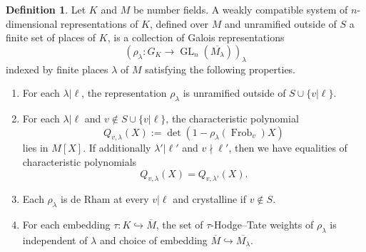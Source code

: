 \documentclass{amsart}
\theoremstyle{definition}
\newtheorem{definition}[theorem]{Definition}
\numberwithin{equation}{section} %
\newcommand{\GL}{\operatorname{GL}}
\newcommand{\Frob}{\operatorname{Frob}}
\newcommand{\ol}[1]{\overline{#1}}
\begin{document}
\begin{definition}
Let $K$ and $M$ be number fields.
A weakly compatible system of $n$-dimensional representations of $K$, defined over $M$ and unramified outside of $S$ a finite set of places of $K$, is a collection of Galois representations
\[
(\rho_\lambda: G_K \to \GL_n(\ol{M_\lambda}))_\lambda
\]
indexed by finite places $\lambda$ of $M$ satisfying the following properties.
\begin{enumerate}
    \item For each $\lambda|\ell$, the representation $\rho_\lambda$ is unramified outside of $S \cup \{v | \ell\}$. 
    \item For each $\lambda|\ell$ and $v \not\in S \cup \{v | \ell\}$, the characteristic polynomial
    \[
    Q_{v,\lambda}(X) := \det(1-\rho_\lambda(\Frob_v)X)
    \]
    lies in $M[X]$.
    If additionally $\lambda'|\ell'$ and $v \nmid \ell'$, then we have equalities of characteristic polynomials
    \[
    Q_{v,\lambda}(X) = Q_{v,\lambda'}(X).
    \]
    \item Each $\rho_\lambda$ is de Rham at every $v|\ell$ and crystalline if $v \not\in S$.
    \item For each embedding $\tau: K \hookrightarrow \ol{M}$, the set of $\tau$-Hodge--Tate weights of $\rho_\lambda$ is independent of $\lambda$ and choice of embedding $\ol{M} \hookrightarrow \ol{M_\lambda}$.
\end{enumerate}
\end{definition}
\end{document}
